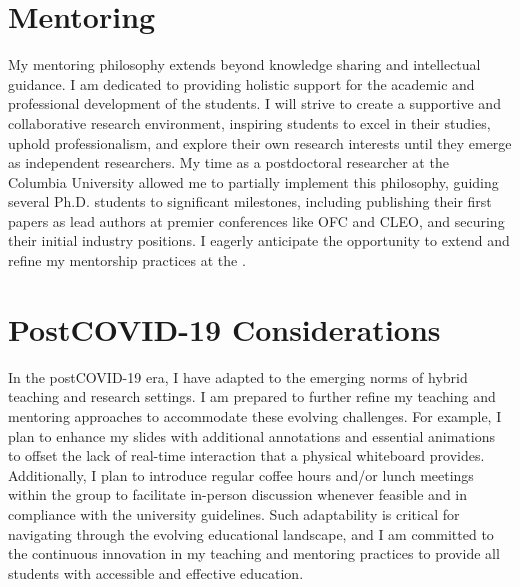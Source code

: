 \section{Mentoring}
My mentoring philosophy extends beyond knowledge sharing and intellectual guidance. I am dedicated to providing holistic support for the academic and professional development of the students. I will strive to create a supportive and collaborative research environment, inspiring students to excel in their studies, uphold professionalism, and explore their own research interests until they emerge as independent researchers. My time as a postdoctoral researcher at the Columbia University allowed me to partially implement this philosophy, guiding several Ph.D. students to significant milestones, including publishing their first papers as lead authors at premier conferences like OFC and CLEO, and securing their initial industry positions. I eagerly anticipate the opportunity to extend and refine my mentorship practices at the \appSchool{}.

\section{Post\textendash COVID-19 Considerations}

In the post\textendash COVID-19 era, I have adapted to the emerging norms of hybrid teaching and research settings. I am prepared to further refine my teaching and mentoring approaches to accommodate these evolving challenges. For example, I plan to enhance my slides with additional annotations and essential animations to offset the lack of real-time interaction that a physical whiteboard provides. Additionally, I plan to introduce regular coffee hours and/or lunch meetings within the group to facilitate in-person discussion whenever feasible and in compliance with the university guidelines. Such adaptability is critical for navigating through the evolving educational landscape, and I am committed to the continuous innovation in my teaching and mentoring practices to provide all students with accessible and effective education.